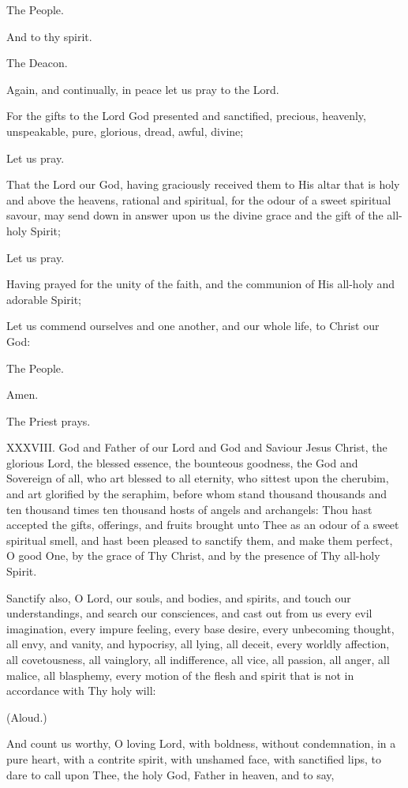 The People.

And to thy spirit.

The Deacon.

Again, and continually, in peace let us pray to the Lord.

For the gifts to the Lord God presented and sanctified, precious, heavenly, unspeakable, pure, glorious, dread, awful, divine;

Let us pray.

That the Lord our God, having graciously received them to His altar that is holy and above the heavens, rational and spiritual, for the odour of a sweet spiritual savour, may send down in answer upon us the divine grace and the gift of the all-holy Spirit;

Let us pray.

Having prayed for the unity of the faith, and the communion of His all-holy and adorable Spirit;

Let us commend ourselves and one another, and our whole life, to Christ our God:

The People.

Amen.

The Priest prays.

XXXVIII. God and Father of our Lord and God and Saviour Jesus Christ, the glorious Lord, the blessed essence, the bounteous goodness, the God and Sovereign of all, who art blessed to all eternity, who sittest upon the cherubim, and art glorified by the seraphim, before whom stand thousand thousands and ten thousand times ten thousand hosts of angels and archangels: Thou hast accepted the gifts, offerings, and fruits brought unto Thee as an odour of a sweet spiritual smell, and hast been pleased to sanctify them, and make them perfect, O good One, by the grace of Thy Christ, and by the presence of Thy all-holy Spirit.

Sanctify also, O Lord, our souls, and bodies, and spirits, and touch our understandings, and search our consciences, and cast out from us every evil imagination, every impure feeling, every base desire, every unbecoming thought, all envy, and vanity, and hypocrisy, all lying, all deceit, every worldly affection, all covetousness, all vainglory, all indifference, all vice, all passion, all anger, all malice, all blasphemy, every motion of the flesh and spirit that is not in accordance with Thy holy will:

(Aloud.)

And count us worthy, O loving Lord, with boldness, without condemnation, in a pure heart, with a contrite spirit, with unshamed face, with sanctified lips, to dare to call upon Thee, the holy God, Father in heaven, and to say,

